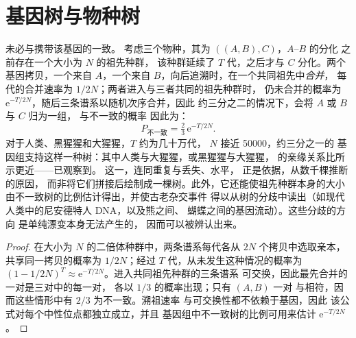 \section{基因树与物种树}

\begin{proposition}[不完全谱系分选]\label{prop:b3:molecular-evolution:ils}
未必与携带该基因的一致。
考虑三个物种，其为 $((A,B),C)$，$A$--$B$ 的分化
之前存在一个大小为 $N$ 的祖先种群，
该种群延续了 $T$ 代，之后才与 $C$ 分化。两个基因拷贝，一个来自
$A$，一个来自 $B$，向后追溯时，在一个共同祖先中\emph{合并}，
每代的合并速率为 $1/2N$；两者进入与三者共同的祖先种群时，
仍未合并的概率为
$\mathrm{e}^{-T/2N}$，随后三条谱系以随机次序合并，因此
约三分之二的情况下，会将 $A$ 或 $B$ 与 $C$ 归为一组，
与不一致的概率
因此为：
\[
P_{\text{不一致}} = \tfrac{2}{3}\,\mathrm{e}^{-T/2N} .
\]
对于人类、黑猩猩和大猩猩，$T$ 约为几十万代，
$N$ 接近 \num{50000}，约三分之一的
基因组支持这样一种树：其中人类与大猩猩，或黑猩猩与大猩猩，
的亲缘关系比所示更近——已观察到。
这一\emph{}，连同重复与丢失、水平，
正是\emph{}依据，从数千棵推断的原因，
而非将它们拼接后绘制成一棵树。此外，它还能使祖先种群本身的大小
由不一致树的比例估计得出，并使古老杂交事件
得以从树的分歧中读出（如现代人类中的尼安德特人 DNA，以及熊之间、
蝴蝶之间的基因流动）。这些分歧的方向
是单纯漂变本身无法产生的，
因而可以被辨认出来。
\end{proposition}
\begin{proof}
在大小为 $N$ 的二倍体种群中，两条谱系每代各从 $2N$
个拷贝中选取亲本，共享同一拷贝的概率为 $1/2N$；经过 $T$
代，从未发生这种情况的概率为 $(1 - 1/2N)^{T} \approx
\mathrm{e}^{-T/2N}$。进入共同祖先种群的三条谱系
可交换，因此最先合并的一对是三对中的每一对，
各以 $1/3$ 的概率出现；只有 $(A,B)$ 一对
与相符，因而这些情形中有 $2/3$ 为不一致。溯祖速率
与可交换性都不依赖于基因，因此
该公式对每个中性位点都独立成立，并且
基因组中不一致树的比例可用来估计
$\mathrm{e}^{-T/2N}$。
\end{proof}

